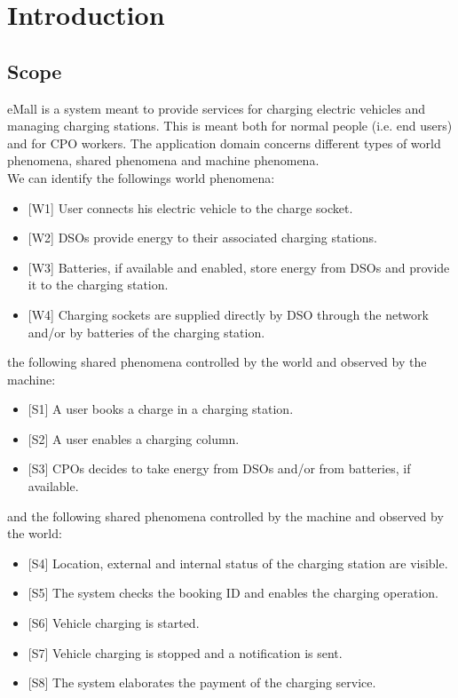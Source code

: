 \documentclass[a4paper]{report}
\begin{document}
\tableofcontents
\listoffigures
\begingroup
\let\clearpage\relax %
\listoftables
\endgroup
\restoregeometry
\chapter{Introduction}
\section{Scope}
eMall is a system meant to provide services for charging electric vehicles and managing charging stations. This is meant both for normal people (i.e. end users) and for CPO workers.
The application domain concerns different types of world phenomena, shared phenomena and machine phenomena. \\
We can identify the followings world phenomena:
\begin{itemize}
\item {[W1]} \label{W1}User connects his electric vehicle to the charge socket.
\item {[W2]} \label{W2}DSOs provide energy to their associated charging stations.
\item {[W3]} \label{W3}Batteries, if available and enabled, store energy from DSOs and provide it to the charging station.
\item {[W4]} \label{W4}Charging sockets are supplied directly by DSO through the network and/or by batteries of the charging station.
\end{itemize}
the following shared phenomena controlled by the world and observed by the machine:
\begin{itemize}
\item {[S1]} A user books a charge in a charging station.
\item {[S2]} A user enables a charging column.
\item {[S3]} CPOs decides to take energy from DSOs and/or from batteries, if available.
\end{itemize}
and the following shared phenomena controlled by the machine and observed by the world:
\begin{itemize}
\item {[S4]} Location, external and internal status of the charging station are visible.
\item {[S5]} The system checks the booking ID and enables the charging operation.
\item {[S6]} Vehicle charging is started.
\item {[S7]} Vehicle charging is stopped and a notification is sent.
\item {[S8]} The system elaborates the payment of the charging service.
\end{itemize}
\end{document}
